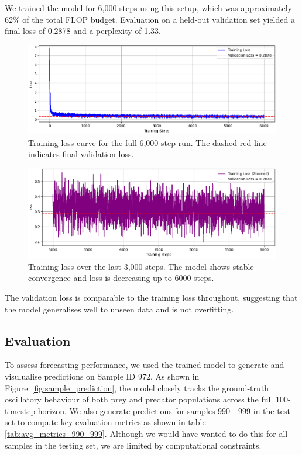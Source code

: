\documentclass[a4paper,12pt]{article}
\begin{document}
We trained the model for 6,000 steps using this setup, which was approximately 62\% of the total FLOP budget. Evaluation on a held-out validation set yielded a final loss of 0.2878 and a perplexity of 1.33.

\begin{figure}[H]
    \centering
    \includegraphics[width=0.85\linewidth]{training_loss.png}
    \caption{Training loss curve for the full 6,000-step run. The dashed red line indicates final validation loss.}
    \label{fig:training_loss}
\end{figure}

\begin{figure}[H]
    \centering
    \includegraphics[width=0.85\linewidth]{zoomed_training_loss.png}
    \caption{Training loss over the last 3,000 steps. The model shows stable convergence and loss is decreasing up to 6000 steps.}
    \label{fig:zoomed_training_loss}
\end{figure}

The validation loss is comparable to the training loss throughout, suggesting that the model generalises well to unseen data and is not overfitting.

\subsection*{Evaluation}

To assess forecasting performance, we used the trained model to generate and visulualise predictions on Sample ID 972. As shown in Figure~\ref{fig:sample_prediction}, the model closely tracks the ground-truth oscillatory behaviour of both prey and predator populations across the full 100-timestep horizon.
We also generate predictions for samples 990 - 999 in the test set to compute key evaluation metrics as shown in table \ref{tab:avg_metrics_990_999}. Although we would have wanted to do this for all samples in the testing set, we are limited by computational constraints.
\end{document}

